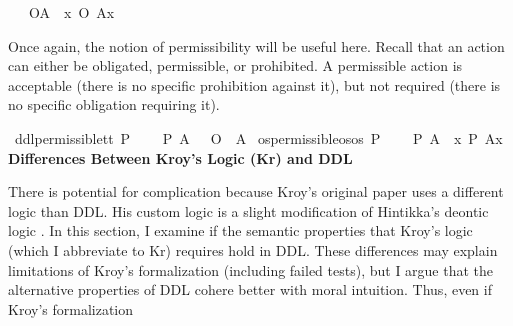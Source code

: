 \begin{isabellebody}
\ \ \ {\isachardoublequoteopen}\isactrlemph O{\isacharbraceleft}A{\isacharbraceright}\ {\isasymequiv}\ {\isasymlambda}x{\isachardot}\ {\isacharparenleft}O\ {\isacharbraceleft}A{\isacharparenleft}x{\isacharparenright}{\isacharbraceright}{\isacharparenright}{\isachardoublequoteclose}%
\begin{isamarkuptext}%
Once again, the notion of permissibility will be useful here. Recall that an action can either be 
obligated, permissible, or prohibited. A permissible action is acceptable (there is no specific prohibition 
against it), but not required (there is no specific obligation requiring it).%
\end{isamarkuptext}\isamarkuptrue%
\isamarkupfalse%
\ ddl{\isacharunderscore}permissible{\isacharcolon}{\isacharcolon}{\isachardoublequoteopen}t{\isasymRightarrow}t{\isachardoublequoteclose}\ {\isacharparenleft}{\isachardoublequoteopen}P\ {\isacharbraceleft}{\isacharunderscore}{\isacharbraceright}{\isachardoublequoteclose}{\isacharparenright}\isanewline
\ \ \ {\isachardoublequoteopen}P\ {\isacharbraceleft}A{\isacharbraceright}\ {\isasymequiv}\ \isactrlbold {\isasymnot}\ {\isacharparenleft}O\ {\isacharbraceleft}\isactrlbold {\isasymnot}\ A{\isacharbraceright}{\isacharparenright}{\isachardoublequoteclose}\isanewline
{}\isamarkupfalse%
\ os{\isacharunderscore}permissible{\isacharcolon}{\isacharcolon}{\isachardoublequoteopen}os{\isasymRightarrow}os{\isachardoublequoteclose}\ {\isacharparenleft}{\isachardoublequoteopen}\isactrlemph P\ {\isacharbraceleft}{\isacharunderscore}{\isacharbraceright}{\isachardoublequoteclose}{\isacharparenright}\isanewline
\ \ \ {\isachardoublequoteopen}\isactrlemph P\ {\isacharbraceleft}A{\isacharbraceright}\ {\isasymequiv}\ {\isasymlambda}x{\isachardot}\ P\ {\isacharbraceleft}A{\isacharparenleft}x{\isacharparenright}{\isacharbraceright}{\isachardoublequoteclose}%
\noindent \textbf{Differences Between Kroy's Logic (Kr) and DDL}
%
\begin{isamarkuptext}%
There is potential for complication because Kroy's original paper uses a different logic than DDL. 
His custom logic is a slight modification of Hintikka's deontic logic \citep{hintikka}. In this section, 
I examine if the semantic properties that Kroy's logic (which I abbreviate to Kr) requires 
hold in DDL. These differences may explain limitations of Kroy's formalization (including failed tests), but I argue that 
the alternative properties of DDL cohere better with moral intuition. Thus, even if Kroy's formalization

\end{isamarkuptext}
\end{isabellebody}
